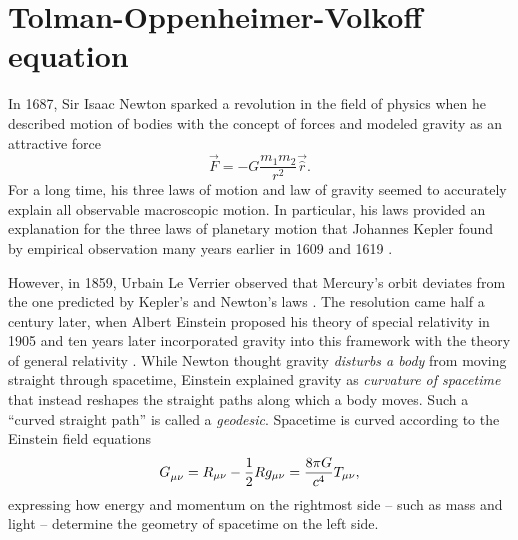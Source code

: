\chapter{Tolman-Oppenheimer-Volkoff equation}
\label{chap:tov}

In 1687, Sir Isaac Newton sparked a revolution in the field of physics when he described motion of bodies with the concept of forces and modeled gravity as an attractive force
\cite{ref:newton}
\begin{equation*}
	\vec{F} = - G \frac{m_1 m_2}{r^2} \vec{\hat{r}} .
\end{equation*}
For a long time, his three laws of motion and law of gravity seemed to accurately explain all observable macroscopic motion.
In particular, his laws provided an explanation for the three laws of planetary motion that Johannes Kepler found by empirical observation many years earlier in 1609 \cite{ref:kepler1} and 1619 \cite{ref:kepler2}.

However, in 1859, Urbain Le Verrier observed that Mercury's orbit deviates from the one predicted by Kepler's and Newton's laws \cite{ref:le_verrier}.
The resolution came half a century later, when Albert Einstein proposed his theory of special relativity in 1905 \cite{ref:einstein_special} and ten years later incorporated gravity into this framework with the theory of general relativity \cite{ref:einstein_general}.
While Newton thought gravity \emph{disturbs a body} from moving straight through spacetime, Einstein explained gravity as \emph{curvature of spacetime} that instead reshapes the straight paths along which a body moves.
Such a ``curved straight path'' is called a \emph{geodesic}.
Spacetime is curved according to the Einstein field equations
\begin{equation*}
	G\indices{_\mu_\nu} = R_{\mu \nu} - \frac{1}{2} R g_{\mu \nu} = \frac{8 \pi G}{c^4} T_{\mu \nu} ,
\end{equation*}
expressing how energy and momentum on the rightmost side -- such as mass and light -- determine the geometry of spacetime on the left side.

